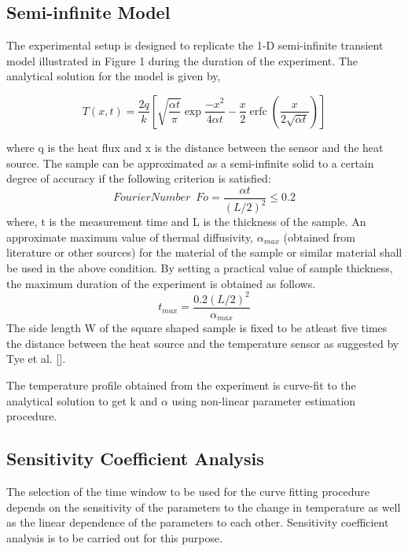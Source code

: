 \documentclass[12pt]{report}
\DeclareMathOperator{\erfc}{erfc}
\begin{document}
\subsection*{Semi-infinite Model}

The experimental setup is designed to replicate the 1-D semi-infinite transient model illustrated in Figure 1 during the duration of the experiment. The analytical solution for the model is given by,

\begin{equation}
T(x,t) = \frac{2q}{k}\left[ \sqrt{\frac{\alpha t}{\pi}}\exp{\frac{-x^{2}}{4 \alpha t}} - \frac{x}{2}\erfc{(\frac{x}{2 \sqrt{\alpha t}})}\right]
\end{equation}

where q is the heat flux and x is the distance between the sensor and the heat source. The sample can be approximated as a semi-infinite solid to a certain degree of accuracy if the following criterion is satisfied:
\begin{equation}
Fourier Number  \phantom{1} Fo = \frac{\alpha t }{(L/2)^{2} } \leq 0.2
\end{equation}
where, t is the measurement time and L is the thickness of
the sample. An approximate maximum value of thermal diffusivity,
$\alpha_{max}$ (obtained from literature or other sources) for the
material of the sample or similar material shall be used in the above
condition. By setting a practical value of sample thickness, the maximum
duration of the experiment is obtained as follows.
\begin{equation}
t_{max} = \frac{0.2 (L/2)^{2}}{\alpha_{max}}
\end{equation}
The side length W of the square shaped sample is fixed to be atleast five times
 the distance between the heat source and the temperature sensor as suggested
by Tye et al. {[}{]}.

The temperature profile obtained from the experiment is curve-fit to the
analytical solution to get k and $\alpha$ using non-linear parameter
estimation procedure.


\subsection*{Sensitivity Coefficient Analysis}

The selection of the time window to be used for the curve fitting
procedure depends on the sensitivity of the parameters to the change in
temperature as well as the linear dependence of the parameters to each
other. Sensitivity coefficient analysis is to be carried out for this
purpose.
\end{document}

